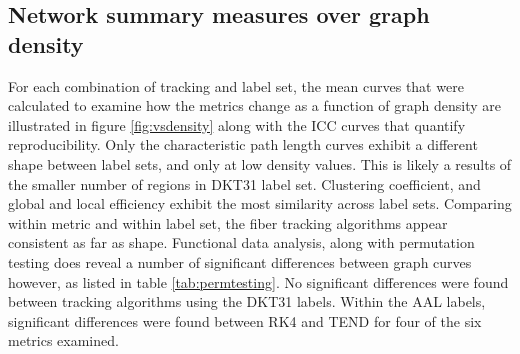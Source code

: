 \documentclass{frontiersSCNS} %
\begin{document}
\subsection{Network summary measures over graph density}
For each combination of tracking and label set, the mean curves that were calculated to examine how the metrics change as a 
function of graph density are illustrated in figure \ref{fig:vsdensity} along with the ICC curves that quantify reproducibility. 
Only the characteristic path length curves exhibit a different shape between label sets, and
only at low density values. This is likely a results of the smaller number of regions in DKT31 label set. Clustering coefficient, and
global and local efficiency exhibit the most similarity across label sets. Comparing within metric and within label set, the fiber tracking
algorithms appear consistent as far as shape. Functional data analysis, along with permutation testing does reveal a number of significant
differences between graph curves however, as listed in table \ref{tab:permtesting}. No significant differences were found between 
tracking algorithms using the DKT31 labels. Within the AAL labels, significant differences were found between RK4 and TEND for four 
of the six metrics examined.
\end{document}
